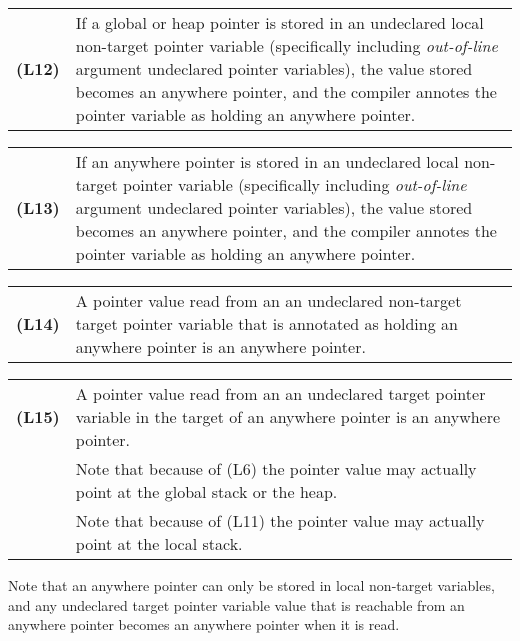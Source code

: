 \documentclass[12pt]{article}
\newcommand{\key}[1]{{\rm \bfseries #1}}
\newenvironment{indpar}[1][0.3in]%
	{\begin{list}{}%
		     {\setlength{\itemsep}{0in}%
		      \setlength{\topsep}{0in}%
		      \setlength{\parsep}{1ex}%
		      \setlength{\labelwidth}{#1}%
		      \setlength{\leftmargin}{#1}%
		      \addtolength{\leftmargin}{\labelsep}}%
	 \item}%
	{\end{list}}
\begin{document}
\begin{indpar}[0.2in]

\begin{tabular}{p{0.5in}p{5.0in}}
\key{(L12)}	& If a global or heap pointer is stored in an
                  undeclared local non-target pointer variable
		  (specifically including {\em out-of-line}
		  argument undeclared pointer variables),
		  the value stored becomes an anywhere pointer,
		  and the compiler
		  annotes the pointer variable as holding
		  an anywhere pointer.
\end{tabular}

\begin{tabular}{p{0.5in}p{5.0in}}
\key{(L13)}	& If an anywhere pointer is stored in an
                  undeclared local non-target pointer variable
		  (specifically including {\em out-of-line}
		  argument undeclared pointer variables),
		  the value stored becomes an anywhere pointer,
		  and the compiler
		  annotes the pointer variable as holding
		  an anywhere pointer.
\end{tabular}

\begin{tabular}{p{0.5in}p{5.0in}}
\key{(L14)}	& A pointer value read from an
		  an undeclared non-target target pointer variable
		  that is annotated as holding an anywhere pointer
		  is an anywhere pointer.
\end{tabular}

\begin{tabular}{p{0.5in}p{5.0in}}
\key{(L15)}	& A pointer value read from an
		  an undeclared target pointer variable
		  in the target of an anywhere pointer
		  is an anywhere pointer.
\\[1ex]
		& Note that because of (L6) the pointer value may actually
		  point at the global stack or the heap.
\\[1ex]
		& Note that because of (L11) the pointer value may actually
		  point at the local stack.
\end{tabular}

\end{indpar}

Note that an anywhere pointer can only be stored in local non-target
variables, and any undeclared target pointer variable value
that is reachable from
an anywhere pointer becomes an anywhere pointer when it is read.
\end{document}

